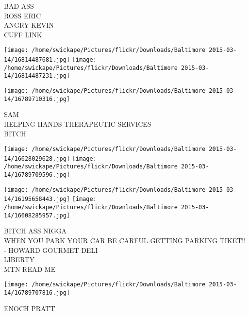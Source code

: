 \documentclass[10pt,letterpaper]{article}
\begin{document}
BAD ASS\\
ROSS ERIC\\
ANGRY KEVIN\\
CUFF LINK
\pagebreak

\texttt{[image: /home/swickape/Pictures/flickr/Downloads/Baltimore 2015-03-14/16814487681.jpg]}
\texttt{[image: /home/swickape/Pictures/flickr/Downloads/Baltimore 2015-03-14/16814487231.jpg]}

\vspace{0.25in}
\texttt{[image: /home/swickape/Pictures/flickr/Downloads/Baltimore 2015-03-14/16789710316.jpg]}

SAM\\
HELPING HANDS THERAPEUTIC SERVICES\\
BITCH
\pagebreak

\texttt{[image: /home/swickape/Pictures/flickr/Downloads/Baltimore 2015-03-14/16628029628.jpg]}
\texttt{[image: /home/swickape/Pictures/flickr/Downloads/Baltimore 2015-03-14/16789709596.jpg]}

\texttt{[image: /home/swickape/Pictures/flickr/Downloads/Baltimore 2015-03-14/16195658443.jpg]}
\texttt{[image: /home/swickape/Pictures/flickr/Downloads/Baltimore 2015-03-14/16608285957.jpg]}

BITCH ASS NIGGA\\
WHEN YOU PARK YOUR CAR BE CARFUL GETTING PARKING TIKET!! {-} HOWARD GOURMET DELI\\
LIBERTY\\
MTN READ ME
\pagebreak

\texttt{[image: /home/swickape/Pictures/flickr/Downloads/Baltimore 2015-03-14/16789707816.jpg]}

ENOCH PRATT
\pagebreak
\end{document}
